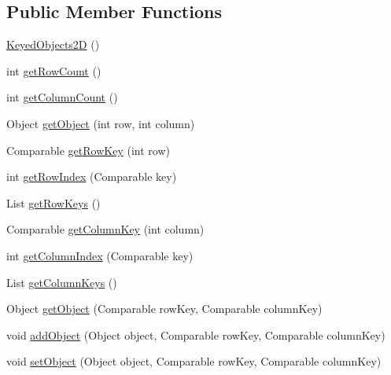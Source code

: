 \subsection*{Public Member Functions}
\begin{DoxyCompactItemize}
\item 
\mbox{\hyperlink{classorg_1_1jfree_1_1data_1_1_keyed_objects2_d_a92a69fb5b817d2c4fd149cc4f5fec0dd}{Keyed\+Objects2D}} ()
\item 
int \mbox{\hyperlink{classorg_1_1jfree_1_1data_1_1_keyed_objects2_d_acc38620c65b59e8ea4caa08e99901f53}{get\+Row\+Count}} ()
\item 
int \mbox{\hyperlink{classorg_1_1jfree_1_1data_1_1_keyed_objects2_d_a5278f36b18983c828dabc81392d30552}{get\+Column\+Count}} ()
\item 
Object \mbox{\hyperlink{classorg_1_1jfree_1_1data_1_1_keyed_objects2_d_a4724a62d9e105b7cc3894aa454903082}{get\+Object}} (int row, int column)
\item 
Comparable \mbox{\hyperlink{classorg_1_1jfree_1_1data_1_1_keyed_objects2_d_a9cf0ed520988bdc2ad943e2c1c941f79}{get\+Row\+Key}} (int row)
\item 
int \mbox{\hyperlink{classorg_1_1jfree_1_1data_1_1_keyed_objects2_d_aa1d3953e9bfcce6c2ec64fc38bbe380d}{get\+Row\+Index}} (Comparable key)
\item 
List \mbox{\hyperlink{classorg_1_1jfree_1_1data_1_1_keyed_objects2_d_ac800d5499d80a223b6f82adadda2066e}{get\+Row\+Keys}} ()
\item 
Comparable \mbox{\hyperlink{classorg_1_1jfree_1_1data_1_1_keyed_objects2_d_a76538aa5c0a5f1b7ea9bc7d52251504e}{get\+Column\+Key}} (int column)
\item 
int \mbox{\hyperlink{classorg_1_1jfree_1_1data_1_1_keyed_objects2_d_a40168035f23e5d7cc542e079ff71573d}{get\+Column\+Index}} (Comparable key)
\item 
List \mbox{\hyperlink{classorg_1_1jfree_1_1data_1_1_keyed_objects2_d_ae5ece09fdc7f933454852e74f21a14d7}{get\+Column\+Keys}} ()
\item 
Object \mbox{\hyperlink{classorg_1_1jfree_1_1data_1_1_keyed_objects2_d_aec253fd1e311efac7c8897f366482f28}{get\+Object}} (Comparable row\+Key, Comparable column\+Key)
\item 
void \mbox{\hyperlink{classorg_1_1jfree_1_1data_1_1_keyed_objects2_d_afa172de81029721b22c1ee5bbde4240d}{add\+Object}} (Object object, Comparable row\+Key, Comparable column\+Key)
\item 
void \mbox{\hyperlink{classorg_1_1jfree_1_1data_1_1_keyed_objects2_d_ace242922a4ef60668a61d137fd1cd7d0}{set\+Object}} (Object object, Comparable row\+Key, Comparable column\+Key)

\end{DoxyCompactItemize}

